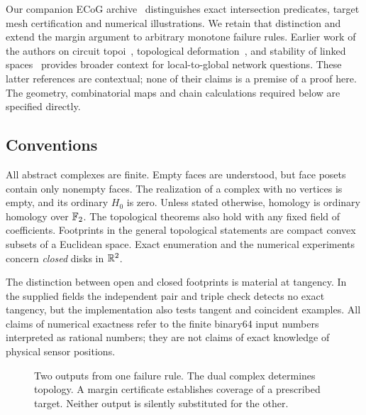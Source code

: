 Our companion ECoG archive~\cite{ecog} distinguishes exact intersection predicates, target mesh certification and numerical illustrations. We retain that distinction and extend the margin argument to arbitrary monotone failure rules. Earlier work of the authors on circuit topoi~\cite{topoi}, topological deformation~\cite{suspension}, and stability of linked spaces~\cite{linkage} provides broader context for local-to-global network questions. These latter references are contextual; none of their claims is a premise of a proof here. The geometry, combinatorial maps and chain calculations required below are specified directly.

\subsection{Conventions}
All abstract complexes are finite. Empty faces are understood, but face posets contain only nonempty faces. The realization of a complex with no vertices is empty, and its ordinary $H_0$ is zero. Unless stated otherwise, homology is ordinary homology over $\mathbb F_2$. The topological theorems also hold with any fixed field of coefficients. Footprints in the general topological statements are compact convex subsets of a Euclidean space. Exact enumeration and the numerical experiments concern \emph{closed} disks in $\mathbb R^2$.

The distinction between open and closed footprints is material at tangency. In the supplied fields the independent pair and triple check detects no exact tangency, but the implementation also tests tangent and coincident examples. All claims of numerical exactness refer to the finite binary64 input numbers interpreted as rational numbers; they are not claims of exact knowledge of physical sensor positions.

\begin{figure}[tb]
\centering
{}
\caption{Two outputs from one failure rule. The dual complex determines topology. A margin certificate establishes coverage of a prescribed target. Neither output is silently substituted for the other.}
\label{fig:workflow}
\end{figure}
